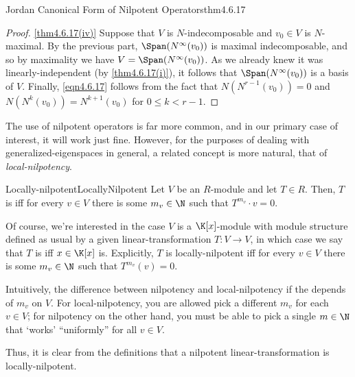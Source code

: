 \begin{thm}{Jordan Canonical Form of Nilpotent Operators}{thm4.6.17}
\begin{proof}
		\blni
		\cref{thm4.6.17(iv)} Suppose that $V$ is $N$-indecomposable and $v_0\in V$ is $N$-maximal.  By the previous part, $\Span (N^{\infty}(v_0))$ is maximal indecomposable, and so by maximality we have $V=\Span (N^{\infty}(v_0))$.  As we already knew it was linearly-independent (by \cref{thm4.6.17(i)}), it follows that $\Span (N^{\infty}(v_0))$ is a basis of $V$.  Finally, \eqref{eqn4.6.17} follows from the fact that $N(N^{r-1}(v_0))=0$ and $N(N^k(v_0))=N^{k+1}(v_0)$ for $0\leq k<r-1$.
	\end{proof}
\end{thm}

The use of nilpotent operators is far more common, and in our primary case of interest, it will work just fine.  However, for the purposes of dealing with generalized-eigenspaces in general, a related concept is more natural, that of \emph{local-nilpotency}.
\begin{dfn}{Locally-nilpotent}{LocallyNilpotent}
	Let $V$ be an $R$-module and let $T\in R$.  Then, $T$ is  iff for every $v\in V$ there is some $m_v\in \N$ such that $T^{m_v}\cdot v=0$.
	\begin{rmk}
		Of course, we're interested in the case $V$ is a $\K [x]$-module with module structure defined as usual by a given linear-transformation $T\colon V\rightarrow V$, in which case we say that $T$ is  iff $x\in \K[x]$ is.  Explicitly, $T$ is locally-nilpotent iff for every $v\in V$ there is some $m_v\in \N$ such that $T^{m_v}(v)=0$.
	\end{rmk}
	\begin{rmk}
		Intuitively, the difference between nilpotency and local-nilpotency if the depends of $m_v$ on $V$.  For local-nilpotency, you are allowed pick a different $m_v$ for each $v\in V$; for nilpotency on the other hand, you must be able to pick a single $m\in \N$ that `works' ``uniformly'' for all $v\in V$.
		
		Thus, it is clear from the definitions that a nilpotent linear-transformation is locally-nilpotent.
	\end{rmk}
\end{dfn}

